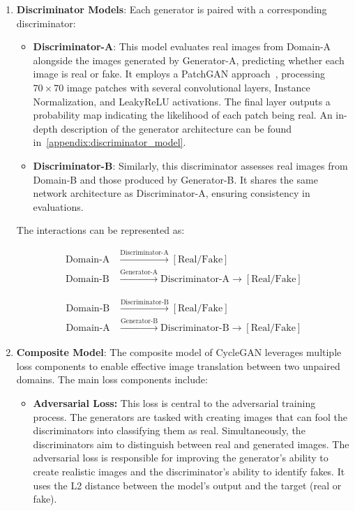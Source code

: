 \documentclass[12pt,DIV14,BCOR12mm,a4paper,footinclude=false,headinclude,parskip=half-,twoside,openright,cleardoublepage=empty,toc=index,bibliography=totoc,listof=totoc]{scrreprt}
\numberwithin{equation}{chapter}
\begin{document}
\begin{enumerate}
    \item \textbf{Discriminator Models}:
    Each generator is paired with a corresponding discriminator:
    \begin{itemize}
        \item \textbf{Discriminator-A}: This model evaluates real images from Domain-A alongside the images generated by Generator-A, predicting whether each image is real or fake. It employs a PatchGAN approach~\cite{isola2017image}, processing $70 \times 70$ image patches with several convolutional layers, Instance Normalization, and LeakyReLU activations. The final layer outputs a probability map indicating the likelihood of each patch being real. An in-depth description of the generator architecture can be found in~\ref{appendix:discriminator_model}. 
        \item \textbf{Discriminator-B}: Similarly, this discriminator assesses real images from Domain-B and those produced by Generator-B. It shares the same network architecture as Discriminator-A, ensuring consistency in evaluations.
    \end{itemize}

    The interactions can be represented as:

    \begin{align*}
    \text{Domain-A} & \xrightarrow{\text{Discriminator-A}} [\text{Real/Fake}] \\
    \text{Domain-B} & \xrightarrow{\text{Generator-A}} \text{Discriminator-A} \xrightarrow{} [\text{Real/Fake}]
    \end{align*}

    \begin{align*}
    \text{Domain-B} & \xrightarrow{\text{Discriminator-B}} [\text{Real/Fake}] \\
    \text{Domain-A} & \xrightarrow{\text{Generator-B}} \text{Discriminator-B} \xrightarrow{} [\text{Real/Fake}]
    \end{align*}

    \item \textbf{Composite Model}: The composite model of CycleGAN leverages multiple loss components to enable effective image translation between two unpaired domains. The main loss components include:

		\begin{itemize}
				\item \textbf{Adversarial Loss:} This loss is central to the adversarial training process. The generators are tasked with creating images that can fool the discriminators into classifying them as real. Simultaneously, the discriminators aim to distinguish between real and generated images. The adversarial loss is responsible for improving the generator’s ability to create realistic images and the discriminator’s ability to identify fakes. It uses the L2 distance between the model's output and the target (real or fake).


\end{itemize}
\end{enumerate}
\end{document}

